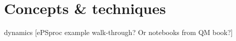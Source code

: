 \section{Concepts \& techniques}

\subsectionPhotoionization dynamics [ePSproc example walk-through? Or notebooks from QM book?]